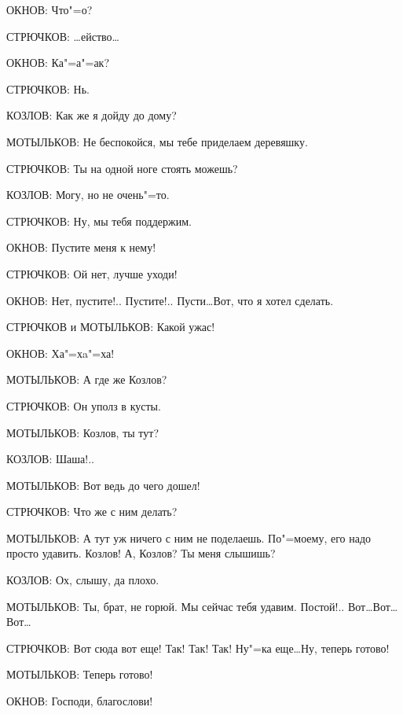 \documentclass{article}
\begin{document}
ОКНОВ: Что"=о?
    
СТРЮЧКОВ: \dots ейство\dots
    
ОКНОВ: Ка"=а"=ак?
    
СТРЮЧКОВ: Нь.
    
КОЗЛОВ: Как же я дойду до дому?
    
МОТЫЛЬКОВ: Не беспокойся, мы тебе приделаем деревяшку.
    
СТРЮЧКОВ: Ты на одной ноге стоять можешь?
    
КОЗЛОВ: Могу, но не очень"=то.
    
СТРЮЧКОВ: Ну, мы тебя поддержим.
    
ОКНОВ: Пустите меня к нему!
    
СТРЮЧКОВ: Ой нет, лучше уходи!
    
ОКНОВ: Нет, пустите!.. Пустите!.. Пусти\dots Вот, что я хотел сделать.
    
СТРЮЧКОВ и МОТЫЛЬКОВ: Какой ужас!
    
ОКНОВ: Ха"=хa"=ха!
    
МОТЫЛЬКОВ: А где же Козлов?
    
СТРЮЧКОВ: Он уполз в кусты.
    
МОТЫЛЬКОВ: Козлов, ты тут?
    
КОЗЛОВ: Шаша!..
    
МОТЫЛЬКОВ: Вот ведь до чего дошел!
    
СТРЮЧКОВ: Что же с ним делать?
    
МОТЫЛЬКОВ: А тут уж ничего с ним не поделаешь. По"=моему, его надо просто удавить. Козлов! А, Козлов? Ты меня слышишь?
    
КОЗЛОВ: Ох, слышу, да плохо.
    
МОТЫЛЬКОВ: Ты, брат, не горюй. Мы сейчас тебя удавим. Постой!.. Вот\dots Вот\dots Вот\dots

СТРЮЧКОВ: Вот сюда вот еще! Так! Так! Так! Ну"=ка еще\dots Ну, теперь готово!
    
МОТЫЛЬКОВ: Теперь готово!
    
ОКНОВ: Господи, благослови!
\end{document}
